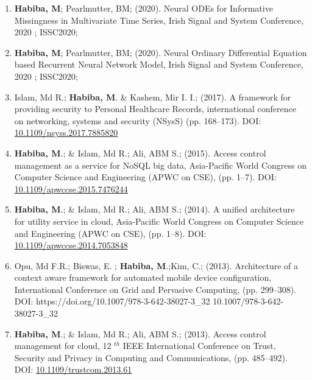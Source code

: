 \documentclass[12pt,]{scrartcl}
\begin{document}
\begin{enumerate}
  \leftskip-0.13in %
  
   \item \textbf{Habiba, M}; Pearlmutter, BM; (2020). Neural ODEs for Informative Missingness in Multivariate Time Series, Irish Signal and System Conference, 2020 ; ISSC2020; 
  
  \item \textbf{Habiba, M}; Pearlmutter, BM; (2020). Neural Ordinary Differential Equation based Recurrent Neural Network Model, Irish Signal and System Conference, 2020 ; ISSC2020;
  \item Islam, Md R.; \textbf{Habiba, M}. \& Kashem, Mir I. I.; (2017). A framework for providing security to Personal Healthcare Records, international conference on networking, systems and security (NSysS) (pp. 168--173). DOI: \href{https://doi.org/10.1109/nsyss.2017.7885820 }{10.1109/nsyss.2017.7885820}
  
  
   \item \textbf{Habiba, M}.; \& Islam, Md R.; Ali, ABM S.; (2015). Access control management as a service for NoSQL big data, Asia-Pacific World Congress on Computer Science and Engineering (APWC on CSE), (pp. 1--7). DOI: \href{https://doi.org/10.1109/apwccse.2015.7476244 }{10.1109/apwccse.2015.7476244}
  
   \item \textbf{Habiba, M}.; \& Islam, Md R.; Ali, ABM S.; (2014). A unified architecture for utility service in cloud, Asia-Pacific World Congress on Computer Science and Engineering (APWC on CSE), (pp. 1--8). DOI: \href{https://doi.org/10.1109/apwccse.2014.7053848 }{10.1109/apwccse.2014.7053848}
 
  \item Opu, Md F.R.; Biswas, E. ; \textbf{Habiba, M}.;Kim, C.; (2013). Architecture of a context aware framework for automated mobile device configuration, International Conference on Grid and Pervasive Computing, (pp. 299--308). DOI: {https://doi.org/10.1007/978-3-642-38027-3\_32  }{10.1007/978-3-642-38027-3\_32}
 
 \item \textbf{Habiba, M}.; \& Islam, Md R.; Ali, ABM S.; (2013). Access control management for cloud, 12 $^{th}$ IEEE International Conference on Trust, Security and Privacy in Computing and Communications, (pp. 485--492). DOI: \href{https://doi.org/10.1109/trustcom.2013.61 }{10.1109/trustcom.2013.61 }


\end{enumerate}
\end{document}
